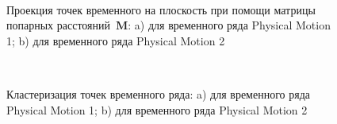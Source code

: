 \begin{figure}[h!t]\center
{}
\\
\caption{Проекция точек временного на плоскость при помощи матрицы попарных расстояний~$\textbf{M}$: a) для временного ряда Physical Motion 1; b) для временного ряда Physical Motion 2}
\label{fig_real_2D}
\end{figure}

\begin{figure}[h!t]\center
{}
\\
\caption{Кластеризация точек временного ряда: 
a) для временного ряда Physical Motion 1; b) для временного ряда Physical Motion 2}
\label{fig_real_claster}
\end{figure}

